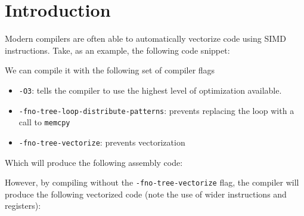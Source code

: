 \documentclass[acmsmall,review, nonacm]{acmart}
\begin{document}



\maketitle

\section{Introduction}
Modern compilers are often able to automatically vectorize code using 
SIMD instructions.
Take, as an example, the following code snippet: 



\noindent We can compile it with the following set of compiler flags
\begin{itemize}
  \item \texttt{-O3}: tells the compiler to use the highest level
        of optimization available.
  \item \texttt{-fno-tree-loop-distribute-patterns}:
        prevents replacing the loop with a call to \texttt{memcpy}
  \item \texttt{-fno-tree-vectorize}: prevents vectorization
\end{itemize}

\noindent Which will produce the following assembly code:



\noindent However, by compiling without the \texttt{-fno-tree-vectorize} flag,
the compiler will produce the following vectorized code (note the use of wider instructions and registers):
\end{document}
